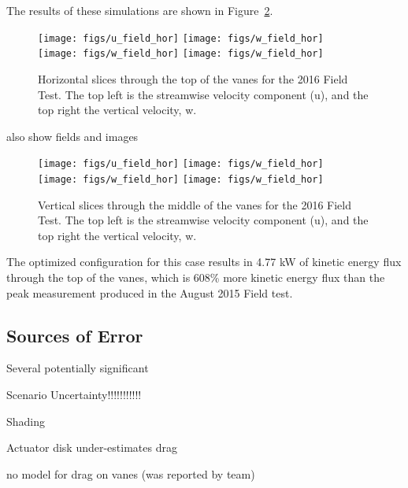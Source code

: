 The results of these simulations are shown in
Figure~\ref{fig:field_hor}. 

\begin{figure}
  \centering
  \texttt{[image: figs/u\_field\_hor]}
  \hfill
  \texttt{[image: figs/w\_field\_hor]}
  \\
  \texttt{[image: figs/w\_field\_hor]}
  \hfill
  \texttt{[image: figs/w\_field\_hor]}
  \label{fig:field_hor}
 \caption{Horizontal slices through the top of the vanes for the
 2016 Field Test. The top left is the streamwise velocity component
 (u), and the top right the vertical velocity, w.} 
\end{figure}


also show fields and images

\begin{figure}
  \centering
  \texttt{[image: figs/u\_field\_hor]}
  \hfill
  \texttt{[image: figs/w\_field\_hor]}
  \\
  \texttt{[image: figs/w\_field\_hor]}
  \hfill
  \texttt{[image: figs/w\_field\_hor]}
  \label{fig:field_hor}
 \caption{Vertical slices through the middle of the vanes for the
 2016 Field Test. The top left is the streamwise velocity component
 (u), and the top right the vertical velocity, w.} 
\end{figure}


The optimized configuration for this case results in 4.77 kW of kinetic
energy flux through the top of the vanes, which is 608\% more kinetic
energy flux than the peak measurement produced in the August 2015 Field
test. 

\subsection{Sources of Error}
\label{sec:field_error}
%

Several potentially significant 

Scenario Uncertainty!!!!!!!!!!!

Shading

Actuator disk under-estimates drag

no model for drag on vanes (was reported by team)

